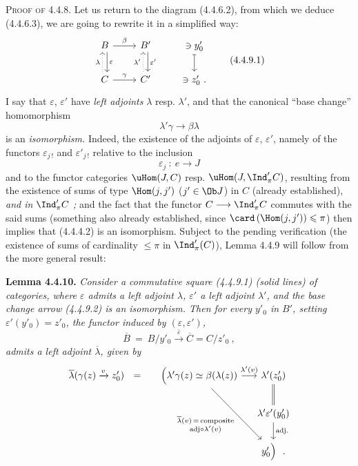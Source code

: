 \textsc{Proof of} 4.4.8. Let us return to the diagram (4.4.6.2), from which we deduce (4.4.6.3), we are going to rewrite it in a simplified way:
\[
\begin{tikzcd}
B \arrow[r, "\beta"] \arrow[d, shift left, "\varepsilon"] & B' \arrow[d, shift left, "\varepsilon'"] & \ni y'_0 \arrow[d, mapsto] \\
C \arrow[r, "\gamma"] \arrow[u, dotted, shift left, "\lambda"] & C' \arrow[u, dotted, shift left, "\lambda'"] & \ni z'_0\ .
\end{tikzcd}
\tag*{(4.4.9.1)}
\]
I say that $\varepsilon$, $\varepsilon'$ have \textit{left adjoints} $\lambda$ resp. $\lambda'$, and that the canonical ``base change'' homomorphism
\[
\lambda'\gamma \longrightarrow \beta\lambda \tag*{(4.4.9.2)}
\]
is an \textit{isomorphism.} Indeed, the existence of the adjoints of $\varepsilon$, $\varepsilon'$, namely of the functors $\varepsilon_{j\,!}$ and $\varepsilon'_{j\,!}$ relative to the inclusion
\[
\varepsilon_j \ :\ e \longrightarrow J
\]
and to the functor categories $\uHom(J,C)$ resp. $\uHom(J,\Ind'_\pi C)$, resulting from the existence of sums of type $\Hom(j,j')$ ($j' \in \Ob J$) in $C$ (already established), \textit{and in} $\Ind'_\pi C$\textit{ ;} and the fact that the functor $C \longrightarrow \Ind'_\pi C$ commutes
with the said sums (something also already established, since $\card\, (\Hom(j,j')) \leqslant \pi$) then implies that (4.4.4.2) is an isomorphism. Subject to the pending verification (the existence %
of sums of cardinality $\leqslant \pi$ in $\Ind'_\pi(C)$), Lemma 4.4.9 will follow from the more general result:

\textbf{Lemma 4.4.10.} \textit{Consider a commutative square (4.4.9.1) (solid lines) of categories, where $\varepsilon$ admits a left adjoint $\lambda$, $\varepsilon'$ a left adjoint $\lambda'$, and the base change arrow (4.4.9.2) is an isomorphism. Then for every $y'_0$ in $B'$, setting $\varepsilon'(y'_0) = z'_0$, the functor induced by $(\varepsilon, \varepsilon')$,}
\[
\overline{B} \ =\ B/y'_0 \xrightarrow{\bar{\varepsilon}} \overline{C} = C/z'_0\ ,
\]
\textit{admits a left adjoint $\overline{\lambda}$, given by}
\[
\begin{tikzcd}[column sep=small]
\overline{\lambda}(\gamma(z) \xrightarrow{v} z'_0) \ \ = & \Bigl(\lambda'\gamma(z) \simeq \beta(\lambda(z)) \arrow[r, "{\lambda'(v)}"] \arrow[ddr, "{\substack{\overline{\lambda}(v) \,=\, \text{composite}\\ \text{adj} \circ \lambda'(v)}}"'] & \lambda'(z'_0) \arrow[d, equal] \\
 & & \lambda'\varepsilon'(y'_0) \arrow[d, "\text{adj.}"] \\
 & & y'_0\Bigr)\ \ .
\end{tikzcd}
\]

